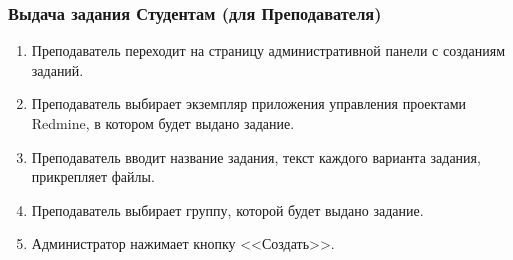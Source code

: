 \subsubsection*{Выдача задания Студентам (для Преподавателя)}
\begin{enumerate}
\item Преподаватель переходит на страницу административной панели с созданиям заданий.
\item Преподаватель выбирает экземпляр приложения управления проектами Redmine, в котором будет выдано задание.
\item Преподаватель вводит название задания, текст каждого варианта задания, прикрепляет файлы.
\item Преподаватель выбирает группу, которой будет выдано задание.
\item Администратор нажимает кнопку <<Создать>>.
\end{enumerate}

\newpage
